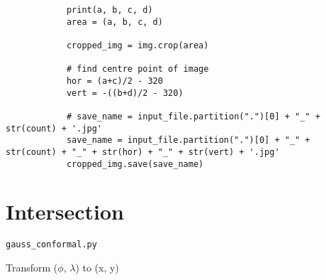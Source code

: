 \begin{lstlisting}
            print(a, b, c, d)
            area = (a, b, c, d)

            cropped_img = img.crop(area)

            # find centre point of image
            hor = (a+c)/2 - 320
            vert = -((b+d)/2 - 320)

            # save_name = input_file.partition(".")[0] + "_" + str(count) + '.jpg'
            save_name = input_file.partition(".")[0] + "_" + str(count) + "_" + str(hor) + "_" + str(vert) + '.jpg'
            cropped_img.save(save_name)
\end{lstlisting}

\newpage

\section{Intersection}\label{intersection}

\verb|gauss_conformal.py|

Transform ($\phi$, $\lambda$) to (x, y)

